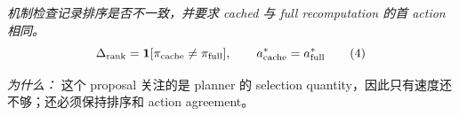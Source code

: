 \documentclass[10pt,a4paper]{article}
\begin{document}
\begin{enumerate}[leftmargin=*,start=3]
\noindent\emph{机制检查记录排序是否不一致，并要求 cached 与 full recomputation 的首 action 相同。}
\begin{equation}
\resizebox{\ifdim\width>\linewidth \linewidth\else\width\fi}{!}{$\displaystyle \Delta_{\mathrm{rank}} = \mathbf{1}[\pi_{\mathrm{cache}} \neq \pi_{\mathrm{full}}], \qquad a^*_{\mathrm{cache}} = a^*_{\mathrm{full}}$} \tag{4}
\end{equation}
\par\emph{为什么：} 这个 proposal 关注的是 planner 的 selection quantity，因此只有速度还不够；还必须保持排序和 action agreement。
\end{enumerate}
\end{document}

